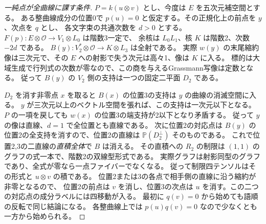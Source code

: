 \begin{proof}[一純点が全曲線に課す条件]
$P=k(u\otimes v)$ とし、今度は $E$ を五次元補空間とする。
ある整曲線成分の位置0で $p(u)=0$ と仮定する。その正規化上の前点を $y$、次点を $q$ とし、
各文字束の共通次数を $d>0$ とする。$F(p):E\otimes\mathcal O\to V_1\otimes L_0$ は階数3一定で、
余核は $L_0L_1$、核 $K$ は階数2、次数 $-2d$ である。
$B(y):V_2^*\otimes\mathcal O\to K\otimes L_3$ は全射である。
実際 $w(y)$ の末尾縮約像は三次元で、その $E$ への射影で失う次元は高々1、像は $K$ に入る。
標的は大域生成で行列式の次数が零なので、この商を与えるGrassmann写像は定数となる。
従って $B(y)$ の $V_2$ 側の支持は一つの固定二平面 $D_2$ である。

$D_2$ を消す非零点 $x$ を取ると $B(x)$ の位置3の支持は $y$ の曲線の消滅空間に入る。
$y$ が三次元以上のベクトル空間を張れば、この支持は一次元以下となる。
$P$ の一項を戻しても $w(x)$ の位置3の端支持が2以下となり矛盾する。
従って $y$ の像は直線、$d=1$ で全位置とも直線である。
次に位置2の対応点は $B(y)$ の位置2の全支持を消すので、位置2の直線は
$\mathbb P(D_2^\perp)$ そのものである。
これで位置2,3の二直線の\emph{直積全体}で $B$ は消える。
その直積への $R_2$ の制限は $(1,1)$ のグラフの式一本で、階数2の双線型形式である。
実際グラフは射影同型のグラフであり、全式が零なら一点ファイバーでなくなる。
従って制限四テンソルはその形式と $u\otimes v$ の積である。
位置2または3の各点で相手側の直線に沿う縮約が非零となるので、
位置2の前点は $v$ を消し、位置3の次点は $u$ を消す。この二つの対応点の成分ラベルには四移動が入る。
最初に $q(v)=0$ から始めても語順の反転で同じ結論になる。
各整曲線上では $p(u)q(v)=0$ なので少なくとも一方から始められる。
\end{proof}
